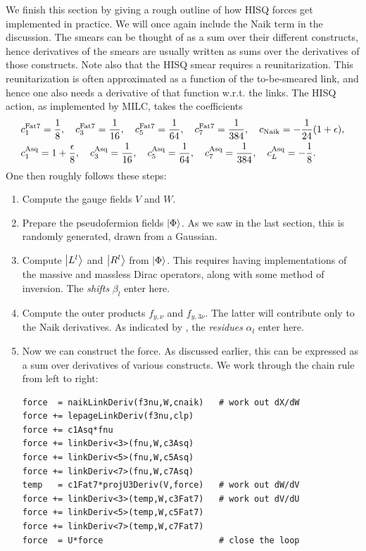 We finish this section by giving a rough outline of how HISQ forces get
implemented in practice. We will once again include the Naik term in the
discussion. The smears can be thought of as a sum over their
different constructs, hence derivatives of the smears are usually written as
sums over the derivatives of those constructs. Note also that the HISQ smear
requires a reunitarization. This reunitarization is often approximated as a
function of the to-be-smeared link, and hence one also needs a derivative of
that function w.r.t. the links. The HISQ action, as implemented by MILC,
takes the coefficients
\begin{equation}\begin{aligned}
&c^{\rm Fat7}_1=\frac{1}{8},~~~
c^{\rm Fat7}_3 =\frac{1}{16},~~~
c^{\rm Fat7}_5 =\frac{1}{64},~~~
c^{\rm Fat7}_7 =\frac{1}{384},~~~
c_{\rm Naik}       =-\frac{1}{24}(1+\epsilon),\\
&c^{\rm Asq}_1 =1+\frac{\epsilon}{8},~~~
c^{\rm Asq}_3  =\frac{1}{16},~~~
c^{\rm Asq}_5  =\frac{1}{64},~~~
c^{\rm Asq}_7  =\frac{1}{384},~~~
c^{\rm Asq}_L  =-\frac{1}{8}.
\end{aligned}\end{equation}
One then roughly follows these steps:
\begin{enumerate}
\item Compute the gauge fields $V$ and $W$.
\item Prepare the pseudofermion fields $\ket{\Phi}$. As we saw in the last
section, this is randomly generated, drawn from a Gaussian.
\item Compute $\ket{L^l}$ and $\ket{R^l}$ from $\ket{\Phi}$. 
This requires having implementations of
the massive and massless Dirac operators, along with some method of inversion.
The {\it shifts} $\beta_l$ enter here.
\item Compute the outer products $f_{y,\nu}$ and $f_{y,3\nu}$. The latter will
contribute only to the Naik derivatives. As indicated by
, the {\it residues} $\alpha_l$ enter here.
\item Now we can construct the force. As discussed earlier, this can be
expressed as a sum over derivatives of various constructs. We work through the
chain rule  from left to right:
\begin{verbatim}
force  = naikLinkDeriv(f3nu,W,cnaik)   # work out dX/dW
force += lepageLinkDeriv(f3nu,clp)
force += c1Asq*fnu 
force += linkDeriv<3>(fnu,W,c3Asq)
force += linkDeriv<5>(fnu,W,c5Asq)
force += linkDeriv<7>(fnu,W,c7Asq)
temp   = c1Fat7*projU3Deriv(V,force)   # work out dW/dV
force += linkDeriv<3>(temp,W,c3Fat7)   # work out dV/dU
force += linkDeriv<5>(temp,W,c5Fat7)
force += linkDeriv<7>(temp,W,c7Fat7)
force  = U*force                       # close the loop
\end{verbatim}
\end{enumerate}
